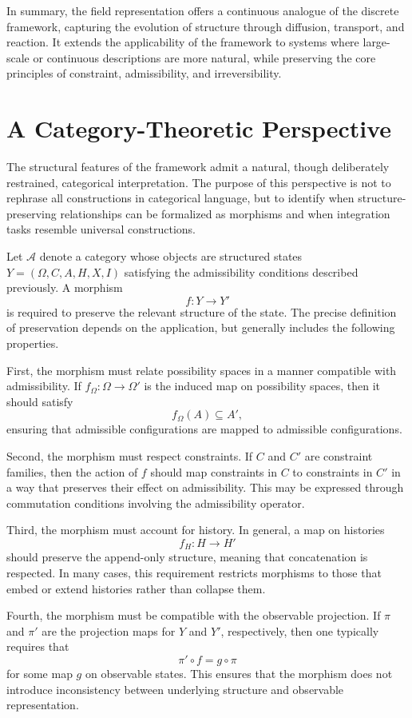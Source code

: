 \documentclass[11pt,oneside]{article}
\begin{document}
In summary, the field representation offers a continuous analogue of the discrete framework, capturing the evolution of structure through diffusion, transport, and reaction. It extends the applicability of the framework to systems where large-scale or continuous descriptions are more natural, while preserving the core principles of constraint, admissibility, and irreversibility.

\section{A Category-Theoretic Perspective}

The structural features of the framework admit a natural, though deliberately restrained, categorical interpretation. The purpose of this perspective is not to rephrase all constructions in categorical language, but to identify when structure-preserving relationships can be formalized as morphisms and when integration tasks resemble universal constructions.

Let \( \mathcal{A} \) denote a category whose objects are structured states \( Y = (\Omega, C, A, H, X, I) \) satisfying the admissibility conditions described previously. A morphism
\[
f : Y \to Y'
\]
is required to preserve the relevant structure of the state. The precise definition of preservation depends on the application, but generally includes the following properties.

First, the morphism must relate possibility spaces in a manner compatible with admissibility. If \( f_\Omega : \Omega \to \Omega' \) is the induced map on possibility spaces, then it should satisfy
\[
f_\Omega(A) \subseteq A',
\]
ensuring that admissible configurations are mapped to admissible configurations.

Second, the morphism must respect constraints. If \( C \) and \( C' \) are constraint families, then the action of \( f \) should map constraints in \( C \) to constraints in \( C' \) in a way that preserves their effect on admissibility. This may be expressed through commutation conditions involving the admissibility operator.

Third, the morphism must account for history. In general, a map on histories
\[
f_H : H \to H'
\]
should preserve the append-only structure, meaning that concatenation is respected. In many cases, this requirement restricts morphisms to those that embed or extend histories rather than collapse them.

Fourth, the morphism must be compatible with the observable projection. If \( \pi \) and \( \pi' \) are the projection maps for \( Y \) and \( Y' \), respectively, then one typically requires that
\[
\pi' \circ f = g \circ \pi
\]
for some map \( g \) on observable states. This ensures that the morphism does not introduce inconsistency between underlying structure and observable representation.
\end{document}
